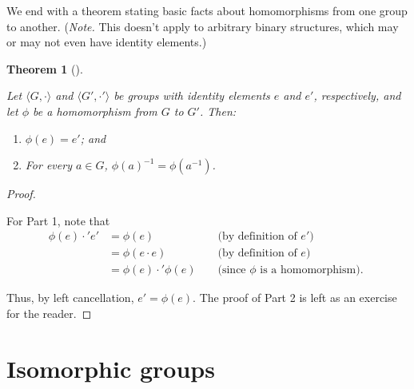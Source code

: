 \documentclass[10pt,]{book}
\theoremstyle{plain}
\newtheorem{theorem}{Theorem}[section]
\theoremstyle{definition}
\theoremstyle{definition}
\theoremstyle{definition}
\theoremstyle{definition}
\numberwithin{equation}{section}
\newcommand{\amp}{ & }
\begin{document}
    We end with a theorem stating basic facts about
    homomorphisms from one group to another. (\emph{Note.} This doesn't apply to arbitrary binary structures, which may or may not even have identity elements.)
\begin{theorem}[{}]\label{homoprops}

        Let \(\langle G,\cdot\rangle\) and \(\langle G',\cdot'\rangle\) be groups with identity elements \(e\) and \(e'\), respectively, and let \(\phi\) be a homomorphism from \(G\) to \(G'\). Then:
        \leavevmode%
\begin{enumerate}
\item\hypertarget{li-139}{}
              \(\phi(e)=e'\); and
\item\hypertarget{li-140}{}
              For every \(a\in G\), \(\phi(a)^{-1}=\phi(a^{-1})\).
\end{enumerate}

\end{theorem}
\begin{proof}\hypertarget{proof-15}{}

      For Part 1, note that
\begin{align*}
\phi(e)\cdot'e'\amp =\phi(e)\amp \amp \text{ (by definition of \(e'\)) }\\
\amp =\phi(e\cdot e) \amp \amp \text{ (by definition of \(e\)) }\\
\amp =\phi(e)\cdot'\phi(e) \amp \amp \text{ (since \(\phi\) is a homomorphism). }
\end{align*}

\par

      Thus, by left
      cancellation, \(e'=\phi(e)\). The proof of Part 2 is left as an exercise for the reader.
\end{proof}
\typeout{************************************************}
\typeout{************************************************}
\section[{Isomorphic groups}]{Isomorphic groups}\label{section-12}
\end{document}
